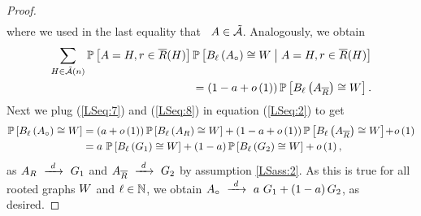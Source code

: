 \begin{proof}
\begin{align}
\end{align}
where we used in the last equality that \whp\ $A\in\tilde{\mathcal{A}}$. Analogously, we obtain
\begin{align}\label{LSeq:8}
	\sum_{H\in\tilde{\mathcal{A}}(n)}\mathbb{P}\left[A=H,r\in \overline{R}(H)\right]\mathbb{P}\left[B_{\ell}\left(A_\circ\right)\cong W \;\middle|\; A=H,r\in \overline{R}(H)\right]
	\\
	=\left(1-a+o\left(1\right)\right)\mathbb{P}\left[B_{\ell}\left(A_{\overline{R}}\right)\cong W\right].
\end{align}
Next we plug (\ref{LSeq:7}) and (\ref{LSeq:8}) in equation (\ref{LSeq:2}) to get
\begin{align*}
\prob{\ballP{\ell}{\unbiased{A}}\isomorphic\detGraph}&=\left(a+\smallo{1}\right)\prob{\ballP{\ell}{A_{\rootSet}}\isomorphic\detGraph}+\left(1-a+\smallo{1}\right)\prob{\ballP{\ell}{A_{\overline{\rootSet}}}\isomorphic\detGraph}\hspace{-0.06cm}+\hspace{-0.06cm}\smallo{1}
\\
&=a~\prob{\ballP{\ell}{G_1}\isomorphic\detGraph}+\left(1-a\right)\prob{\ballP{\ell}{G_2}\isomorphic\detGraph}+\smallo{1},
\end{align*}
as $A_{R}~\xrightarrow{~d~}~G_1$ and $A_{\overline{R}}~\xrightarrow{~d~}~G_2$ by assumption \ref{LSass:2}. As this is true for all rooted graphs $W$ and $\ell\in\mathbb{N}$, we obtain $A_\circ~\xrightarrow{~d~}~a~G_1+\left(1-a\right)G_2$, as desired.
\end{proof}

